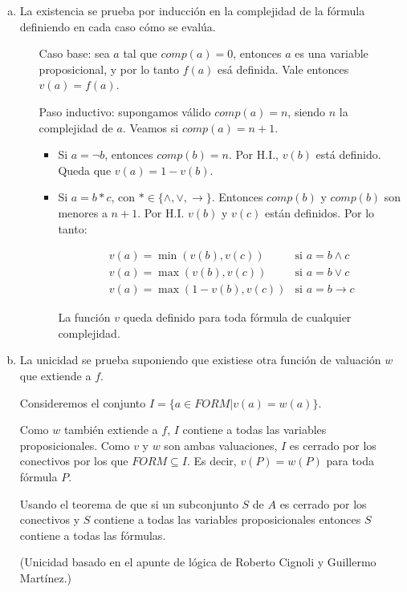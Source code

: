 \begin{questions}
\begin{solution}
\begin{enumerate}[a)]
 \item La existencia se prueba por inducci\'on en la complejidad de la f\'ormula definiendo en cada caso c\'omo se eval\'ua. 
  
  \begin{enumerate}[\quad]
  \item[Caso base:] sea $a$ tal que $comp(a) = 0$, entonces $a$ es una variable proposicional, y por lo tanto $f(a)$ es\'a definida. Vale entonces $v(a) = f(a)$. 
  
  \item[Paso inductivo:] supongamos v\'alido $comp(a) = n$, siendo $n$ la complejidad de $a$. Veamos si $comp(a) = n+1$. 
    
    \begin{itemize}
      \item Si $a=\neg b$, entonces $comp(b) = n$. Por H.I., $v(b)$ est\'a definido. Queda que $v(a) = 1 - v(b)$. 
      
      \item Si $a=b*c$, con $* \in \{\wedge, \vee, \rightarrow \}$. Entonces $comp(b)$ y $comp(b)$ son menores a $n+1$. Por H.I. $v(b)$ y $v(c)$ est\'an definidos. Por lo tanto: 
      
      \begin{eqnarray*}
      v(a) = \min(v(b), v(c)) & \text{si } a = b \wedge c\\
      v(a) = \max(v(b), v(c)) & \text{si } a = b \vee c \\
      v(a) = \max(1-v(b), v(c)) & \text{si } a = b \rightarrow c
      \end{eqnarray*}
      
      La funci\'on $v$ queda definido para toda f\'ormula de cualquier complejidad.
    \end{itemize}
  \end{enumerate}
 \item La unicidad se prueba suponiendo que existiese otra funci\'on de valuaci\'on $w$ que extiende a $f$. 
 
 Consideremos el conjunto $I = \{a\in FORM | v(a) = w(a) \}$. 
 
 Como $w$ tambi\'en extiende a $f$, $I$ contiene a todas las variables proposicionales. Como $v$ y $w$ son ambas valuaciones, $I$ es cerrado por los conectivos por los que $FORM \subseteq I$. Es decir, $v(P) =w(P)$ para toda f\'ormula $P$. 
 
 Usando el teorema de que si un subconjunto $S$ de $A$ es cerrado por los conectivos y $S$ contiene a todas las variables proposicionales entonces $S$ contiene a todas las f\'ormulas. 
 
 (Unicidad basado en el apunte de lógica de Roberto Cignoli y Guillermo Martínez.)
\end{enumerate}

\end{solution}

\end{questions}